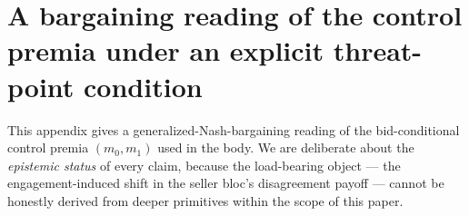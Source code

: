 %

\providecommand{\E}{\mathbb{E}}
\providecommand{\PP}{\mathbb{P}}
\providecommand{\1}{\mathbf{1}}
\providecommand{\Var}{\operatorname{Var}}
\providecommand{\Dtil}{\widetilde{\Delta}}
\providecommand{\mtil}{\widetilde{m}}
\providecommand{\mR}{m^{R}}

\makeatletter
{}
\makeatother

\section{A bargaining reading of the control premia under an explicit
threat-point condition}
\label{app:bg}

This appendix gives a generalized-Nash-bargaining reading of the bid-conditional
control premia $(m_{0},m_{1})$ used in the body. We are deliberate about the
\emph{epistemic status} of every claim, because the load-bearing object --- the
engagement-induced shift in the seller bloc's disagreement payoff --- cannot be
honestly derived from deeper primitives within the scope of this paper.

